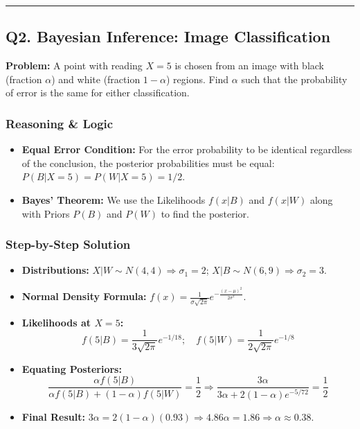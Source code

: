 \documentclass[11pt]{article}
\begin{document}
\vspace{0.5cm}
\hrule
\vspace{0.5cm}

\subsection*{Q2. Bayesian Inference: Image Classification}

\textbf{Problem:} A point with reading $X=5$ is chosen from an image with black (fraction $\alpha$) and white (fraction $1-\alpha$) regions. Find $\alpha$ such that the probability of error is the same for either classification.

\subsubsection*{Reasoning \& Logic}
\begin{itemize}
    \item \textbf{Equal Error Condition:} For the error probability to be identical regardless of the conclusion, the posterior probabilities must be equal: $P(B|X=5) = P(W|X=5) = 1/2$.
    \item \textbf{Bayes' Theorem:} We use the Likelihoods $f(x|B)$ and $f(x|W)$ along with Priors $P(B)$ and $P(W)$ to find the posterior.
\end{itemize}

\subsubsection*{Step-by-Step Solution}
\begin{itemize}
    \item \textbf{Distributions:} $X|W \sim N(4, 4) \Rightarrow \sigma_1=2$; $X|B \sim N(6, 9) \Rightarrow \sigma_2=3$.
    \item \textbf{Normal Density Formula:} $f(x) = \frac{1}{\sigma\sqrt{2\pi}}e^{-\frac{(x-\mu)^2}{2\sigma^2}}$.
    \item \textbf{Likelihoods at $X=5$:} 
    \[ f(5|B) = \frac{1}{3\sqrt{2\pi}}e^{-1/18}; \quad f(5|W) = \frac{1}{2\sqrt{2\pi}}e^{-1/8} \]
    \item \textbf{Equating Posteriors:} 
    \[ \frac{\alpha f(5|B)}{\alpha f(5|B) + (1-\alpha)f(5|W)} = \frac{1}{2} \Rightarrow \frac{3\alpha}{3\alpha + 2(1-\alpha)e^{-5/72}} = \frac{1}{2} \]
    \item \textbf{Final Result:} $3\alpha = 2(1-\alpha)(0.93) \Rightarrow 4.86\alpha = 1.86 \Rightarrow \alpha \approx 0.38$.
\end{itemize}
\end{document}
